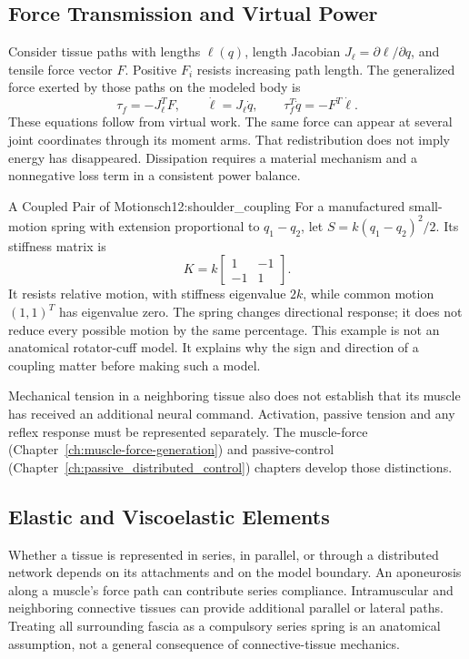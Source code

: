 \subsection{Force Transmission and Virtual Power}

Consider tissue paths with lengths $\ell(q)$, length Jacobian $J_\ell=\partial\ell/\partial q$, and tensile force vector $F$. Positive $F_i$ resists increasing path length. The generalized force exerted by those paths on the modeled body is
\[
\tau_f=-J_\ell^T F,\qquad
\dot\ell=J_\ell\dot q,\qquad
\tau_f^T\dot q=-F^T\dot\ell.
\]
These equations follow from virtual work. The same force can appear at several joint coordinates through its moment arms. That redistribution does not imply energy has disappeared. Dissipation requires a material mechanism and a nonnegative loss term in a consistent power balance.

\begin{example}{A Coupled Pair of Motions}{ch12:shoulder_coupling}
For a manufactured small-motion spring with extension proportional to $q_1-q_2$, let $S=k(q_1-q_2)^2/2$. Its stiffness matrix is
\[
K=k\begin{bmatrix}1&-1\\-1&1\end{bmatrix}.
\]
It resists relative motion, with stiffness eigenvalue $2k$, while common motion $(1,1)^T$ has eigenvalue zero. The spring changes directional response; it does not reduce every possible motion by the same percentage. This example is not an anatomical rotator-cuff model. It explains why the sign and direction of a coupling matter before making such a model.

Mechanical tension in a neighboring tissue also does not establish that its muscle has received an additional neural command. Activation, passive tension and any reflex response must be represented separately. The muscle-force (Chapter~\ref{ch:muscle-force-generation}) and passive-control (Chapter~\ref{ch:passive_distributed_control}) chapters develop those distinctions.
\end{example}

\subsection{Elastic and Viscoelastic Elements}

Whether a tissue is represented in series, in parallel, or through a distributed network depends on its attachments and on the model boundary. An aponeurosis along a muscle's force path can contribute series compliance. Intramuscular and neighboring connective tissues can provide additional parallel or lateral paths. Treating all surrounding fascia as a compulsory series spring is an anatomical assumption, not a general consequence of connective-tissue mechanics.

